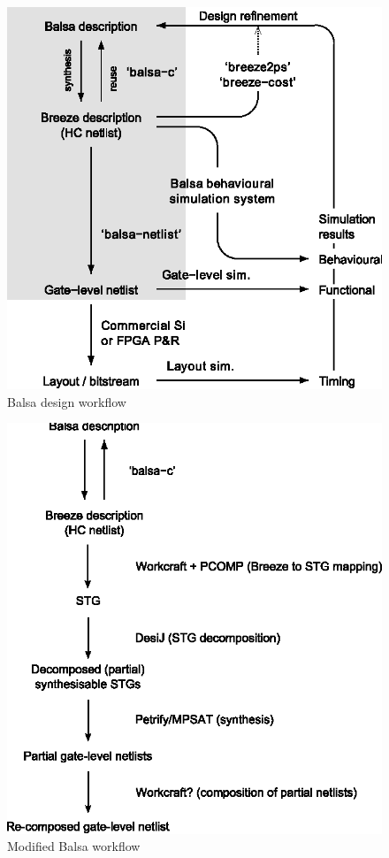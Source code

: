 \label{sec:balsa-workflow}

\begin{figure}
\centering
\includegraphics[width=0.40\paperwidth]{figures/balsa-design-workflow}

\caption{Balsa design workflow\label{fig:Balsa-design-workflow}}
\end{figure}


\begin{figure}
\centering
\includegraphics[width=0.40\paperwidth]{figures/balsa-workflow-modification}

\caption{Modified Balsa workflow\label{fig:Modified-Balsa-workflow}}
\end{figure}


